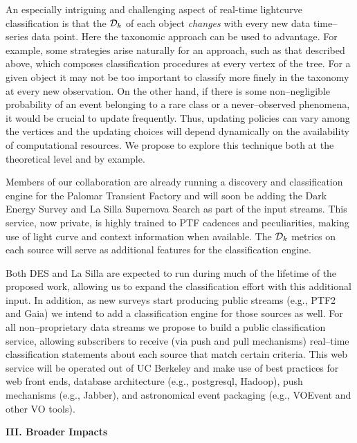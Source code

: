 An especially intriguing and challenging aspect of  real-time lightcurve
classification is that the ${\cal D}_k$ of each object \emph{changes} with every
new data time--series data point. Here the taxonomic approach can be used to
advantage. For example, some strategies arise naturally for an approach, such as
that described above, which composes classification procedures at every vertex
of the tree. For a given object it may not be too important to classify more
finely in the taxonomy at every new observation.  On the other hand, if there is
some non--negligible probability of an event belonging to a rare class or a
never--observed phenomena, it would be crucial to update frequently.  Thus,
updating policies can vary among the vertices and the updating choices will
depend dynamically on the availability of computational resources. We propose to
explore this technique both at the theoretical level and by example.

 \smallskip

Members of our collaboration are already running a discovery and classification
engine for the Palomar Transient Factory and will soon be adding the Dark Energy
Survey and La Silla Supernova Search as part of the input streams.  This
service, now private, is highly trained to PTF cadences and peculiarities,
making use of light curve and context information when available. The ${\cal
D}_k$ metrics on each source will serve as additional features for the
classification engine.

Both DES and La Silla are expected to run during much of the lifetime of the
proposed work, allowing us to expand the classification effort with this
additional input. In addition, as new surveys start producing public streams
(e.g., PTF2 and Gaia) we intend to add a classification engine for those sources
as well.  For all non--proprietary data streams we propose to build a public
classification service, allowing subscribers to receive (via push and pull
mechanisms) real--time classification statements about each source that match
certain criteria. This web service will be operated out of UC Berkeley and make
use of best practices for web front ends, database architecture (e.g.,
postgresql, Hadoop), push mechanisms (e.g., Jabber), and astronomical event
packaging (e.g., VOEvent and other VO tools).

\bigskip \centerline{\bf III. Broader Impacts} \smallskip

